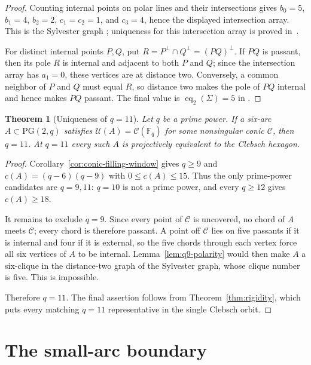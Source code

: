 \documentclass[11pt]{article}
\newtheorem{theorem}{Theorem}[section]
\theoremstyle{remark}
\newcommand{\PG}{\mathrm{PG}}
\newcommand{\F}{\mathbb{F}}
\newcommand{\cC}{\mathcal{C}}
\newcommand{\cU}{\mathcal{U}}
\begin{document}
\begin{proof}
Counting internal points on polar lines and their intersections gives
$b_0=5$, $b_1=4$, $b_2=2$, $c_1=c_2=1$, and $c_3=4$, hence the displayed
intersection array. This is the Sylvester graph
\cite[\S13.1.2]{BrouwerCohenNeumaier1989}; uniqueness for this intersection
array is proved in~\cite[Thm.~6]{JurisicVidali2019}.

For distinct internal points $P,Q$, put
$R=P^\perp\cap Q^\perp=(PQ)^\perp$. If $PQ$ is passant, then its pole $R$
is internal and adjacent to both $P$ and $Q$; since the intersection array
has $a_1=0$, these vertices are at distance two. Conversely, a common
neighbor of $P$ and $Q$ must equal $R$, so distance two makes the pole of
$PQ$ internal and hence makes $PQ$ passant. The final value is
$\operatorname{eq}_2(\Sigma)=5$ in
\cite[Table~1]{AbiadJabalAmeliReijnders2025}.
\end{proof}

\begin{theorem}[Uniqueness of $q=11$]
\label{thm:why11}
Let $q$ be a prime power. If a six-arc $A\subset\PG(2,q)$ satisfies
$\cU(A)=\cC(\F_q)$ for some nonsingular conic $\cC$, then $q=11$.
At $q=11$ every such $A$ is projectively equivalent to the
Clebsch hexagon.
\end{theorem}

\begin{proof}
Corollary~\ref{cor:conic-filling-window} gives $q\ge9$ and
$c(A)=(q-6)(q-9)$ with $0\le c(A)\le15$. Thus the only prime-power
candidates are $q=9,11$: $q=10$ is not a prime power, and every
$q\ge12$ gives $c(A)\ge18$.

It remains to exclude $q=9$. Since every point of $\cC$ is uncovered, no
chord of $A$ meets $\cC$; every chord is therefore passant. A point off
$\cC$ lies on five passants if it is internal and four if it is external,
so the five chords through each vertex force all six vertices of $A$ to be
internal. Lemma~\ref{lem:q9-polarity} would then make $A$ a
six-clique in the distance-two graph of the Sylvester graph, whose clique
number is five. This is impossible.

Therefore $q=11$. The final assertion follows from
Theorem~\ref{thm:rigidity}, which puts every matching $q=11$ representative
in the single Clebsch orbit.
\end{proof}

\section{The small-arc boundary}
\end{document}
